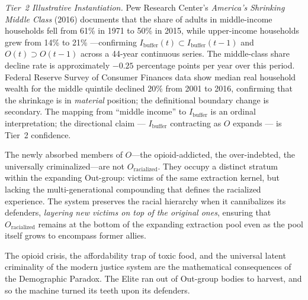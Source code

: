 \noindent\textit{Tier~2 Illustrative Instantiation.} Pew Research Center's \textit{America's Shrinking Middle Class} (2016) documents that the share of adults in middle-income households fell from 61\% in 1971 to 50\% in 2015, while upper-income households grew from 14\% to 21\% \cite{pew_shrinking_middle_class}---confirming $I_{\text{buffer}}(t) \subset I_{\text{buffer}}(t-1)$ and $O(t) \supset O(t-1)$ across a 44-year continuous series. The middle-class share decline rate is approximately $-0.25$ percentage points per year over this period. Federal Reserve Survey of Consumer Finances data show median real household wealth for the middle quintile declined 20\% from 2001 to 2016, confirming that the shrinkage is in \textit{material} position; the definitional boundary change is secondary. The mapping from ``middle income'' to $I_{\text{buffer}}$ is an ordinal interpretation; the directional claim --- $I_{\text{buffer}}$ contracting as $O$ expands --- is Tier~2 confidence.

The newly absorbed members of $O$---the opioid-addicted, the over-indebted, the universally criminalized---are not $O_{\text{racialized}}$. They occupy a distinct stratum within the expanding Out-group: victims of the same extraction kernel, but lacking the multi-generational compounding that defines the racialized experience. The system preserves the racial hierarchy when it cannibalizes its defenders, \textit{layering new victims on top of the original ones}, ensuring that $O_{\text{racialized}}$ remains at the bottom of the expanding extraction pool even as the pool itself grows to encompass former allies.

The opioid crisis, the affordability trap of toxic food, and the universal latent criminality of the modern justice system are the mathematical consequences of the Demographic Paradox. The Elite ran out of Out-group bodies to harvest, and so the machine turned its teeth upon its defenders.

